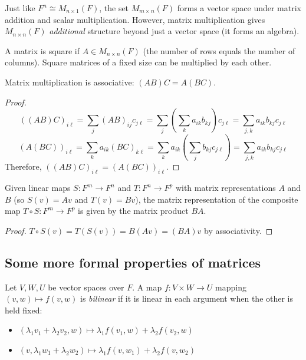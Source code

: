 \documentclass[../linear_algebra_and_groups.tex]{subfiles}
\begin{document}
\begin{remark}
    Just like $F^n\cong M_{n\times 1}(F)$, the set $M_{m\times n}(F)$ forms a vector space under matrix addition and scalar multiplication. However, matrix multiplication gives $M_{n\times n}(F)$ \textit{additional} structure beyond just a vector space (it forms an algebra). 
\end{remark}

\begin{definition}
    A matrix is square if $A\in M_{n\times n}(F)$ (the number of rows equals the number of columns). Square matrices of a fixed size can be multiplied by each other.
\end{definition}

\begin{proposition}
    \begin{shaded*}
        Matrix multiplication is associative: $(AB)C = A(BC)$.
    \end{shaded*}
\end{proposition}
\begin{proof}
    $$((AB)C)_{i\ell} = \sum_j (AB)_{ij} c_{j\ell} = \sum_j \left(\sum_k a_{ik}b_{kj}\right) c_{j\ell} = \sum_{j,k} a_{ik}b_{kj}c_{j\ell}$$
    $$(A(BC))_{i\ell} = \sum_k a_{ik} (BC)_{k\ell} = \sum_k a_{ik} \left(\sum_j b_{kj}c_{j\ell}\right) = \sum_{j,k} a_{ik}b_{kj}c_{j\ell}$$
    Therefore, $((AB)C)_{i\ell} = (A(BC))_{i\ell}$.
    \qedhere
\end{proof}

\begin{corollary}
    \begin{shaded*}
        Given linear maps $S:F^m\to F^n$ and $T:F^n\to F^p$ with matrix representations $A$ and $B$ (so $S(v)=Av$ and $T(v)=Bv$), the matrix representation of the composite map $T\circ S:F^m\to F^p$ is given by the matrix product $BA$.
    \end{shaded*}
\end{corollary}
\begin{proof}
    $T \circ S(v) = T(S(v)) = B(Av) = (BA)v$ by associativity.
    \qedhere
\end{proof}

\subsection{Some more formal properties of matrices}

\begin{definition}
    \begin{shaded*}
        Let $V,W,U$ be vector spaces over $F$. A map $f:V\times W\to U$ mapping $(v,w)\mapsto f(v,w)$ is \textit{bilinear} if it is linear in each argument when the other is held fixed:
        \begin{itemize}
            \item $(\lambda_1v_1+\lambda_2v_2,w)\mapsto \lambda_1f(v_1,w)+\lambda_2f(v_2,w)$
            \item $(v,\lambda_1w_1+\lambda_2w_2)\mapsto\lambda_1f(v,w_1)+\lambda_2f(v,w_2)$
        \end{itemize}
    \end{shaded*}
\end{definition}
\end{document}
